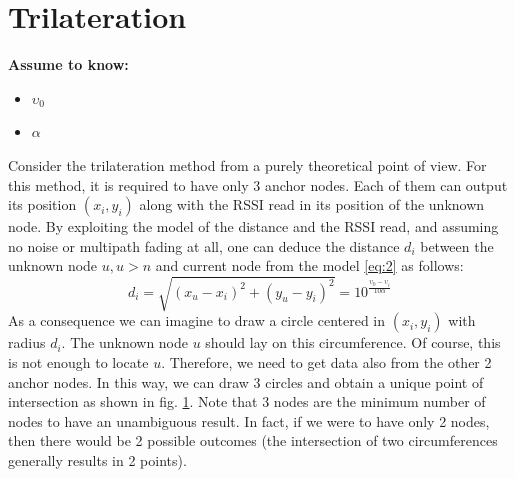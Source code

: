\documentclass[12pt,twoside]{report}
\begin{document}
\clearpage
\section{Trilateration}
  \begin{center}
  \textbf{Assume to know:}
  \begin{itemize}
    \centering
    \item $\upsilon_0$
    \item $\alpha$
  \end{itemize}
  \end{center}
Consider the trilateration method from a purely theoretical point of view. For this method, it is required to have only 3 anchor nodes. Each of them can output its position $(x_i,y_i)$ along with the RSSI read in its position of the unknown node. By exploiting the model of the distance and the RSSI read, and assuming no noise or multipath fading at all, one can deduce the distance $d_i$ between the unknown node $u, u>n$ and current node from the model \ref{eq:2} as follows:  
\begin{equation}
    d_i=\sqrt{(x_u-x_i)^2+(y_u-y_i)^2}=10^{\frac{\upsilon_0-\upsilon_i}{10\alpha}}   
    \label{eq:18}
\end{equation}
As a consequence we can imagine to draw a circle centered in $(x_i,y_i)$ with radius $d_i$. The unknown node $u$ should lay on this circumference. Of course, this is not enough to locate $u$. Therefore, we need to get data also from the other 2 anchor nodes. In this way, we can draw 3 circles and obtain a unique point of intersection as shown in fig. \ref{fig:trilOK}. Note that 3 nodes are the minimum number of nodes to have an unambiguous result. In fact, if we were to have only 2 nodes, then there would be 2 possible outcomes (the intersection of two circumferences generally results in 2 points).
\begin{figure}
    \centering
    \caption{}
    \label{fig:trilOK}
\end{figure}
\end{document}
